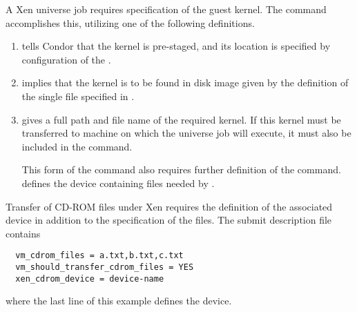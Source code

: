A Xen  universe job requires specification of the
guest kernel. 
The  command accomplishes this, 
utilizing one of the following definitions.
\begin{enumerate}
\item {}
  tells Condor that the kernel is pre-staged, and its location is
  specified by configuration of the .

\item {} implies that the kernel
  is to be found in disk image given by the definition of the single file
  specified in . 



\item {} gives a full path and
  file name of the required kernel.  If this kernel must be transferred
  to machine on which the  universe job will execute,
  it must also be included in the  command. 

  This form of the  command also requires further
  definition of the  command.
   defines the device containing files needed by
  .

\end{enumerate}

Transfer of CD-ROM files under Xen requires the definition of
the associated device in addition to the specification of the
files.
The submit description file contains
\begin{verbatim}
  vm_cdrom_files = a.txt,b.txt,c.txt
  vm_should_transfer_cdrom_files = YES
  xen_cdrom_device = device-name
\end{verbatim}
where the last line of this example defines the device.



